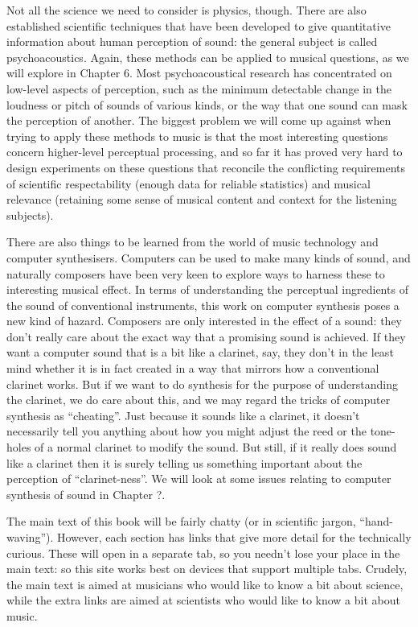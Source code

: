   Not all the science we need to consider is physics, though. There are also 
  established scientific techniques that have been developed to give 
  quantitative information about human perception of sound: the general subject 
  is called psychoacoustics. Again, these methods can be applied to musical 
  questions, as we will explore in Chapter 6. Most psychoacoustical research 
  has concentrated on low-level aspects of perception, such as the minimum 
  detectable change in the loudness or pitch of sounds of various kinds, or the 
  way that one sound can mask the perception of another. The biggest problem we 
  will come up against when trying to apply these methods to music is that the 
  most interesting questions concern higher-level perceptual processing, and so 
  far it has proved very hard to design experiments on these questions that 
  reconcile the conflicting requirements of scientific respectability (enough 
  data for reliable statistics) and musical relevance (retaining some sense of 
  musical content and context for the listening subjects). 

  There are also things to be learned from the world of music technology and 
  computer synthesisers. Computers can be used to make many kinds of sound, and 
  naturally composers have been very keen to explore ways to harness these to 
  interesting musical effect. In terms of understanding the perceptual 
  ingredients of the sound of conventional instruments, this work on computer 
  synthesis poses a new kind of hazard. Composers are only interested in the 
  effect of a sound: they don't really care about the exact way that a 
  promising sound is achieved. If they want a computer sound that is a bit like 
  a clarinet, say, they don't in the least mind whether it is in fact created 
  in a way that mirrors how a conventional clarinet works. But if we want to do 
  synthesis for the purpose of understanding the clarinet, we do care about 
  this, and we may regard the tricks of computer synthesis as ``cheating''. 
  Just because it sounds like a clarinet, it doesn't necessarily tell you 
  anything about how you might adjust the reed or the tone-holes of a normal 
  clarinet to modify the sound. But still, if it really does sound like a 
  clarinet then it is surely telling us something important about the 
  perception of ``clarinet-ness''. We will look at some issues relating to 
  computer synthesis of sound in Chapter ?. 

  The main text of this book will be fairly chatty (or in scientific jargon, 
  ``hand-waving''). However, each section has links that give more detail for 
  the technically curious. These will open in a separate tab, so you needn't 
  lose your place in the main text: so this site works best on devices that 
  support multiple tabs. Crudely, the main text is aimed at musicians who would 
  like to know a bit about science, while the extra links are aimed at 
  scientists who would like to know a bit about music. 

